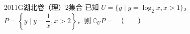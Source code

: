 
\begin{problem}{2011}{G}{湖北卷（理）}{2}{集合}
已知 $U=\{y\mid y=\log_2x,x>1\}$，$P=\left\{y\mid y=\dfrac{1}{x},x>2\right\}$，则 $\complement_UP=$ \hspace{1cm}（　　）
\begin{choices}
\choice{{$\left[\dfrac{1}{2},+\infty\right)$}}
\choice{{$\left(-\infty,0\right)\cup\left[\dfrac{1}{2},+\infty\right)$}}
\end{choices}
\end{problem}

\begin{answer}

\end{answer}

\begin{solutions}

\end{solutions}